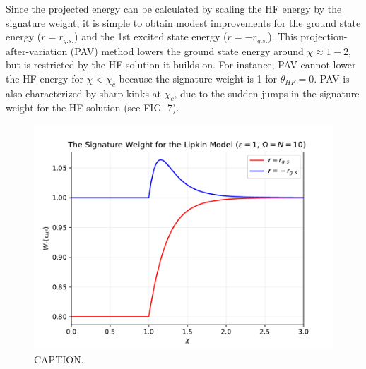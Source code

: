 \documentclass[prb,aps,twocolumn,showpacs,10pt]{revtex4-2}
\begin{document}
Since the projected energy can be calculated by scaling the HF energy by the signature weight, it is simple to obtain modest improvements for the ground state energy ($r=r_{g.s.}$) and the 1st excited state energy ($r=-r_{g.s.}$). This projection-after-variation (PAV) method lowers the ground state energy around $\chi \approx 1-2$, but is restricted by the HF solution it builds on. For instance, PAV cannot lower the HF energy for $\chi < \chi_c$ because the signature weight is 1 for $\theta_{HF}=0$. PAV is also characterized by sharp kinks at $\chi_c$, due to the sudden jumps in the signature weight for the HF solution (see FIG. 7).

\begin{figure}
  \includegraphics[width=\linewidth]{../figures/plot_weight.pdf}
  \caption{CAPTION.}
\end{figure}
\end{document}
